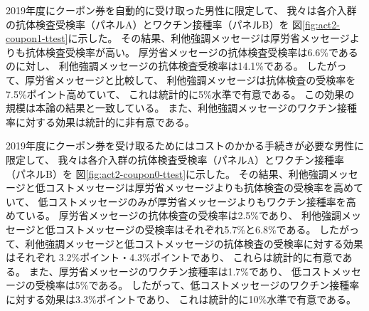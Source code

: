 \documentclass[
  11pt,
  a4paper,
]{article}
\begin{document}
2019年度にクーポン券を自動的に受け取った男性に限定して、
我々は各介入群の抗体検査受検率（パネルA）とワクチン接種率（パネルB）を
図\ref{fig:act2-coupon1-ttest}に示した。
その結果、利他強調メッセージは厚労省メッセージよりも抗体検査受検率が高い。
厚労省メッセージの抗体検査受検率は6.6\%であるのに対し、
利他強調メッセージの抗体検査受検率は14.1\%である。
したがって、厚労省メッセージと比較して、
利他強調メッセージは抗体検査の受検率を7.5\%ポイント高めていて、
これは統計的に5\%水準で有意である。
この効果の規模は本論の結果と一致している。
また、利他強調メッセージのワクチン接種率に対する効果は統計的に非有意である。

2019年度にクーポン券を受け取るためにはコストのかかる手続きが必要な男性に限定して、
我々は各介入群の抗体検査受検率（パネルA）とワクチン接種率（パネルB）を
図\ref{fig:act2-coupon0-ttest}に示した。
その結果、利他強調メッセージと低コストメッセージは厚労省メッセージよりも抗体検査の受検率を高めていて、
低コストメッセージのみが厚労省メッセージよりもワクチン接種率を高めている。
厚労省メッセージの抗体検査の受検率は2.5\%であり、
利他強調メッセージと低コストメッセージの受検率はそれぞれ5.7\%と6.8\%である。
したがって、利他強調メッセージと低コストメッセージの抗体検査の受検率に対する効果はそれぞれ
3.2\%ポイント・4.3\%ポイントであり、
これらは統計的に有意である。
また、厚労省メッセージのワクチン接種率は1.7\%であり、
低コストメッセージの受検率は5\%である。
したがって、低コストメッセージのワクチン接種率に対する効果は3.3\%ポイントであり、
これは統計的に10\%水準で有意である。
\end{document}
